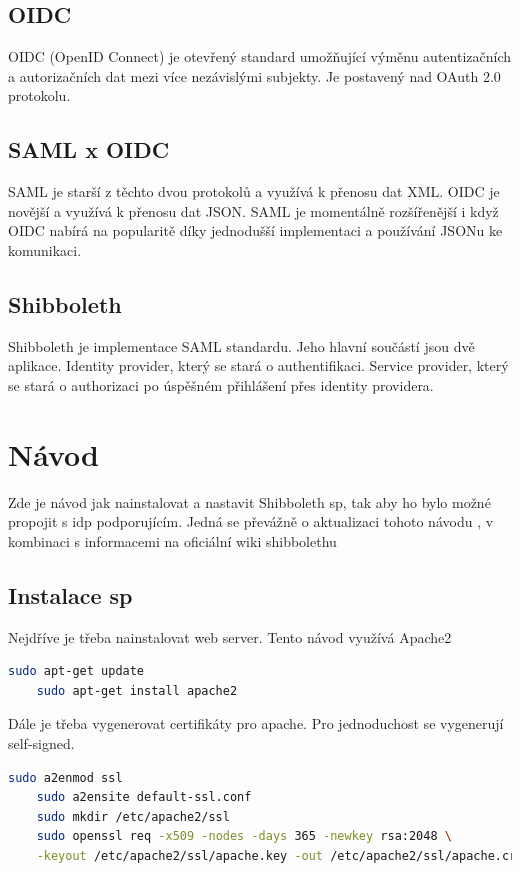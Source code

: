 \section{OIDC}

OIDC (OpenID Connect) je otevřený standard umožňující výměnu autentizačních a autorizačních dat mezi více nezávislými subjekty. Je postavený nad OAuth 2.0 protokolu.\cite{OIDC}

\section{SAML x OIDC}

SAML je starší z těchto dvou protokolů a využívá k přenosu dat XML. OIDC je novější a využívá k přenosu dat JSON. 
SAML je momentálně rozšířenější i když OIDC nabírá na popularitě díky jednodušší implementaci a používání JSONu ke komunikaci.\cite{SAMLxOIDC}

\section{Shibboleth}

Shibboleth je implementace SAML standardu. Jeho hlavní součástí jsou dvě aplikace. Identity provider, který se stará o authentifikaci. Service provider, který se stará o authorizaci po úspěšném přihlášení přes identity providera. \cite{shibbolethWiki}

\chapter{Návod}
\label{návod}

Zde je návod jak nainstalovat a nastavit Shibboleth sp, tak aby ho bylo možné propojit s idp podporujícím. Jedná se převážně o aktualizaci tohoto návodu \cite{shibbolethSpInstallation}, v kombinaci s informacemi na oficiální wiki shibbolethu\cite{shibbolethWikiSP}

\section{Instalace sp}

Nejdříve je třeba nainstalovat web server. Tento návod využívá Apache2
\begin{lstlisting}[language=Bash]
    sudo apt-get update
    sudo apt-get install apache2
\end{lstlisting}

Dále je třeba vygenerovat certifikáty pro apache. Pro jednoduchost se vygenerují self-signed.
\begin{lstlisting}[language=Bash]
    sudo a2enmod ssl
    sudo a2ensite default-ssl.conf
    sudo mkdir /etc/apache2/ssl
    sudo openssl req -x509 -nodes -days 365 -newkey rsa:2048 \
    -keyout /etc/apache2/ssl/apache.key -out /etc/apache2/ssl/apache.crt
\end{lstlisting}


